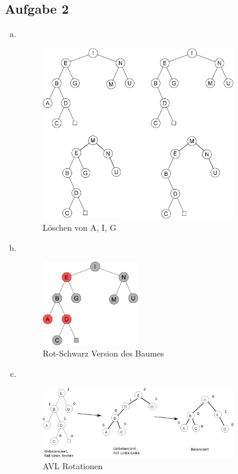 \documentclass[11pt]{article}
\begin{document}
\subsection*{Aufgabe 2}
\begin{enumerate}[a)]
  \item $ $
    \begin{figure}[h!]
      \centering
      \includegraphics[width=0.8\textwidth]{avl_search_tree_delete}
      \caption{Löschen von A, I, G}
    \end{figure}
    
  \item $ $

    \begin{figure}[h!]
      \centering
      \includegraphics[width=0.4\textwidth]{avl_search_tree_red_black}
      \caption{Rot-Schwarz Version des Baumes}
    \end{figure}
    
  \item $ $

    \begin{figure}[h!]
      \centering
      \includegraphics[width=0.8\textwidth]{avl_search_tree_rotate}
      \caption{AVL Rotationen}
    \end{figure}
    
\end{enumerate} 
\end{document}

